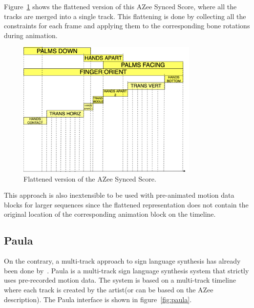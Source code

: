 \documentclass[../../main.tex]{subfiles}
\begin{document}
Figure~\ref{fig:azee_flattened_score} shows the flattened version of this AZee Synced Score, where all the tracks are merged into a single track. This flattening is done by collecting all the constraints for each frame and applying them to the corresponding bone rotations during animation.

\begin{figure}[h]
    \centering
    \includegraphics[width=0.8\textwidth]{chapters/multi_track/images/azee_flattened_score.png}
    \caption{Flattened version of the AZee Synced Score.}
    \label{fig:azee_flattened_score}
\end{figure}

This approach is also inextensible to be used with pre-animated motion data blocks for larger sequences since the flattened representation does not contain the original location of the corresponding animation block on the timeline. 

\subsection{Paula}
\label{ch:multi_track:related_work:paula}

On the contrary, a multi-track approach to sign language synthesis has already been done by~\cite{filhol2017synthesizing}. Paula is a multi-track sign language synthesis system that strictly uses pre-recorded motion data. The system is based on a multi-track timeline where each track is created by the artist(or can be based on the AZee description). The Paula interface is shown in figure~\ref{fig:paula}.
\end{document}
